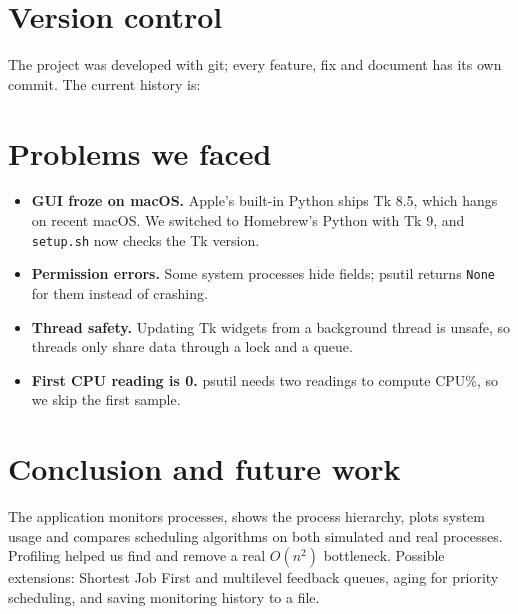 \documentclass[11pt,a4paper]{article}
\begin{document}
\section{Version control}
The project was developed with git; every feature, fix and document has its own commit.
The current history is:


\section{Problems we faced}
\begin{itemize}
  \item \textbf{GUI froze on macOS.} Apple's built-in Python ships Tk 8.5, which hangs on
        recent macOS. We switched to Homebrew's Python with Tk 9, and \texttt{setup.sh} now
        checks the Tk version.
  \item \textbf{Permission errors.} Some system processes hide fields; psutil returns
        \texttt{None} for them instead of crashing.
  \item \textbf{Thread safety.} Updating Tk widgets from a background thread is unsafe, so
        threads only share data through a lock and a queue.
  \item \textbf{First CPU reading is 0.} psutil needs two readings to compute CPU\%, so we
        skip the first sample.
\end{itemize}

\section{Conclusion and future work}
The application monitors processes, shows the process hierarchy, plots system usage and
compares scheduling algorithms on both simulated and real processes. Profiling helped
us find and remove a real $O(n^2)$ bottleneck. Possible extensions: Shortest Job First
and multilevel feedback queues, aging for priority scheduling, and saving monitoring
history to a file.

\end{document}
